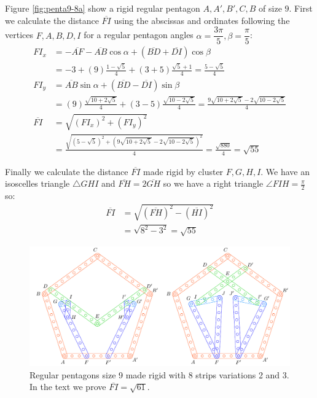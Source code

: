 \documentclass[11pt]{article}
\begin{document}
Figure \ref{fig:penta9-8a} show a rigid regular pentagon $A,A',B',C,B$ of size $9$. First we calculate the distance $\overline{FI}$ using the abscissas and ordinates following the vertices $F,A,B,D,I$ for a regular pentagon angles $\alpha=\dfrac{3\pi}5, \beta=\dfrac{\pi}5$:
\begin{align}
FI_x &= -\overline{AF} - \overline{AB}\cos\alpha + (\overline{BD} + \overline{DI})\cos\beta\nonumber\\
 &= -3 + (9)\frac{1-\sqrt5}4 + (3+5)\frac{\sqrt5+1}4 = \frac{5-\sqrt5}4\\
FI_y &= \overline{AB}\sin\alpha + (\overline{BD}-\overline{DI})\sin\beta\nonumber\\
 &= (9)\frac{\sqrt{10+2\sqrt5}}4 + (3-5)\frac{\sqrt{10-2\sqrt5}}4
 = \frac{9\sqrt{10+2\sqrt5} - 2\sqrt{10-2\sqrt5}}4\\
\overline{FI} &= \sqrt{(FI_x)^2 + (FI_y)^2}\nonumber\\
 &= \frac{\sqrt{(5-\sqrt5)^2 + (9\sqrt{10+2\sqrt5} - 2\sqrt{10-2\sqrt5})^2}}4
 = \frac{\sqrt{880}}4 = \sqrt{55}
\end{align}

Finally we calculate the distance $\overline{FI}$ made rigid by cluster $F,G,H,I$. We have an isoscelles triangle $\triangle{GHI}$ and $\overline{FH}=2\overline{GH}$ so we have a right triangle $\angle{FIH}=\frac{\pi}2$ so: \begin{align}
\overline{FI} &= \sqrt{(\overline{FH})^2 - (\overline{HI})^2}\nonumber\\
 &= \sqrt{8^2 - 3^2} = \sqrt{55}
\end{align}

\begin{figure}[H]
 \centering
 \includegraphics[scale=0.95]{9/penta9-8b}
 \caption{Regular pentagons size 9 made rigid with 8 strips variations 2 and 3. In the text we prove $\overline{FI} = \sqrt{61}$.}
 \label{fig:penta9-8b}
\end{figure}
\end{document}
